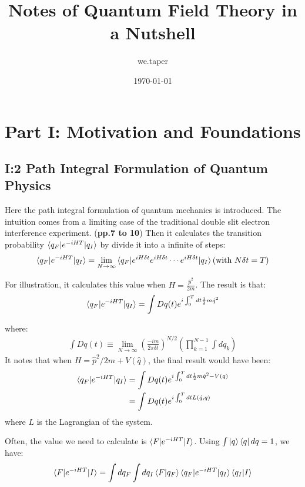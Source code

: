 \documentclass{book}
\title{Notes of Quantum Field Theory in a Nutshell}
\date{\today}
\author{we.taper}
\numberwithin{equation}{subsection} %
\theoremstyle{definition}
\begin{document}
	\maketitle
	\tableofcontents

\chapter{Part I: Motivation and Foundations}
\label{sec:QFT_in_a_Nutshell.Part_I}
\section{I:2 Path Integral Formulation of Quantum Physics}
\label{sec:QFT_in_a_Nutshell_Part_I.2}
Here the path integral formulation of quantum mechanics is introduced.
The intuition comes from a limiting case of the traditional double 
slit electron interference experiment. (\textbf{pp.7 to 10}) Then 
it calculates the transition probability $\braket{q_F|e^{-iHT}|q_I}$
by divide it into a infinite of steps:
\begin{align}
    \braket{q_F|e^{-iHT}|q_I} = \lim_{N\to \infty}
    \braket{q_F|e^{iH\delta t}e^{iH\delta t}\cdots e^{iH\delta t}|q_I}
    (\text{with }N\delta t = T)
\end{align}

For illustration, it calculates this value when 
$H=\frac{\hat{p}^2}{2m}$. The result is that:
\begin{align*}
    \braket{q_F|e^{-iHT}|q_I} = \int Dq(t) 
        e^{i\int_0^T dt \frac{1}{2}m \dot{q}^2 }
\end{align*}

where:
\begin{align}
    \int Dq(t) \equiv \lim_{N\to \infty} 
    \left( \frac{-im}{2\pi \delta t}\right)^{N/2}
    \left( \prod_{k=1}^{N-1} \int dq_k \right)
\end{align}
It notes that when $H=\hat{p}^2/2m + V(\hat{q})$, the final result
would have been:
\begin{align}
    \label{eq:QFT_in_a_Nutshell_Part_I.2.TransProbability}
    \braket{q_F|e^{-iHT}|q_I} &= \int Dq(t) 
        e^{i\int_0^T dt \frac{1}{2}m \dot{q}^2 - V(q)}
        \nonumber \\
        &=\int Dq(t) e^{i \int_0^T dt L(\dot{q}, q)}
\end{align}
where $L$ is the Lagrangian of the system.

Often, the value we need to calculate is $\braket{F|e^{-iHT}|I}$.
Using $\int \ket{q}\bra{q} dq=1$, we have:
\begin{align}
    \braket{F|e^{-iHT}|I} = \int dq_F \int dq_I
        \braket{F|q_F} \braket{q_F|e^{-iHT}|q_I}\braket{q_I|I}
\end{align}
\end{document}
